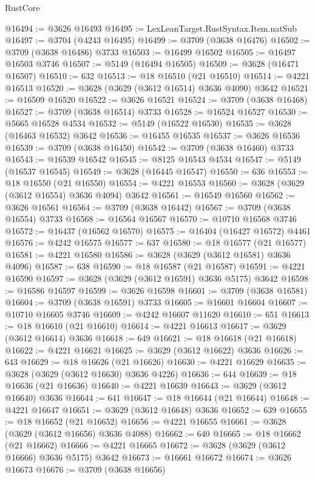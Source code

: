 \begin{lexlean}{RustCore}
\begin{coremodule}
@16494 := @3626 @16493
@16495 := LexLeanTarget.RustSyntax.Item.natSub
@16497 := @3704 (@4243 @16495)
@16499 := @3709 (@3638 @16476)
@16502 := @3709 (@3638 @16486) @3733
@16503 := @16499 @16502
@16505 := @16497 @16503 @3746
@16507 := @5149 (@16494 @16505)
@16509 := @3628 (@16471 @16507)
@16510 := 632
@16513 := @18 @16510 (@21 @16510)
@16514 := @4221 @16513
@16520 := @3628 (@3629 (@3612 @16514) @3636 @4090) @3642
@16521 := @16509 @16520
@16522 := @3626 @16521
@16524 := @3709 (@3638 @16468)
@16527 := @3709 (@3638 @16514) @3733
@16528 := @16524 @16527
@16530 := @5665 @16528 @4534
@16532 := @5149 (@16522 @16530)
@16535 := @3628 (@16463 @16532) @3642
@16536 := @16455 @16535
@16537 := @3626 @16536
@16539 := @3709 (@3638 @16450)
@16542 := @3709 (@3638 @16460) @3733
@16543 := @16539 @16542
@16545 := @8125 @16543 @4534
@16547 := @5149 (@16537 @16545)
@16549 := @3628 (@16445 @16547)
@16550 := 636
@16553 := @18 @16550 (@21 @16550)
@16554 := @4221 @16553
@16560 := @3628 (@3629 (@3612 @16554) @3636 @4094) @3642
@16561 := @16549 @16560
@16562 := @3626 @16561
@16564 := @3709 (@3638 @16442)
@16567 := @3709 (@3638 @16554) @3733
@16568 := @16564 @16567
@16570 := @10710 @16568 @3746
@16572 := @16437 (@16562 @16570)
@16575 := @16404 (@16427 @16572) @4461
@16576 := @4242 @16575
@16577 := 637
@16580 := @18 @16577 (@21 @16577)
@16581 := @4221 @16580
@16586 := @3628 (@3629 (@3612 @16581) @3636 @4096)
@16587 := 638
@16590 := @18 @16587 (@21 @16587)
@16591 := @4221 @16590
@16597 := @3628 (@3629 (@3612 @16591) @3636 @5175) @3642
@16598 := @16586 @16597
@16599 := @3626 @16598
@16601 := @3709 (@3638 @16581)
@16604 := @3709 (@3638 @16591) @3733
@16605 := @16601 @16604
@16607 := @10710 @16605 @3746
@16609 := @4242 @16607 @11620
@16610 := 651
@16613 := @18 @16610 (@21 @16610)
@16614 := @4221 @16613
@16617 := @3629 (@3612 @16614) @3636
@16618 := 649
@16621 := @18 @16618 (@21 @16618)
@16622 := @4221 @16621
@16625 := @3629 (@3612 @16622) @3636
@16626 := 643
@16629 := @18 @16626 (@21 @16626)
@16630 := @4221 @16629
@16635 := @3628 (@3629 (@3612 @16630) @3636 @4226)
@16636 := 644
@16639 := @18 @16636 (@21 @16636)
@16640 := @4221 @16639
@16643 := @3629 (@3612 @16640) @3636
@16644 := 641
@16647 := @18 @16644 (@21 @16644)
@16648 := @4221 @16647
@16651 := @3629 (@3612 @16648) @3636
@16652 := 639
@16655 := @18 @16652 (@21 @16652)
@16656 := @4221 @16655
@16661 := @3628 (@3629 (@3612 @16656) @3636 @4088)
@16662 := 640
@16665 := @18 @16662 (@21 @16662)
@16666 := @4221 @16665
@16672 := @3628 (@3629 (@3612 @16666) @3636 @5175) @3642
@16673 := @16661 @16672
@16674 := @3626 @16673
@16676 := @3709 (@3638 @16656)

\end{coremodule}
\end{lexlean}
